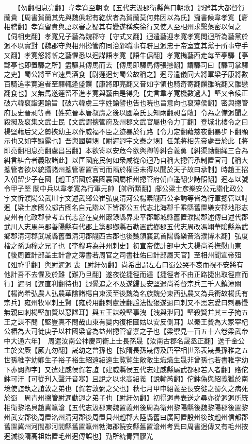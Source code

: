 　　【勿翻相息亮翻】韋孝寛至朝歌【五代志汲郡衛縣舊曰朝歌】迥遣其大都督賀蘭貴【周書賀蘭其先與魏俱起有紇伏者為賀蘭莫何弗因以為氏】齎書候韋孝寛【齎相稽翻】孝寛留貴與語以審之疑其有變遂稱疾徐行又使人至相州求醫藥密以伺之【伺相吏翻】孝寛兄子藝為魏郡守【守式又翻】迥遣藝迎孝寛孝寛問迥所為藝黨於迥不以實對【魏郡守與相州搃管府同治鄴職事有聨且迥忠于帝室宜其黨于所事守手又翻】孝寛怒將斬之藝懼悉以迥謀語孝寛【語牛倨翻】孝寛擕藝西走每至亭驛【亭郵亭也即置驛之所】盡驅其傳馬而去【傳馬即驛馬傳張戀翻】謂驛司曰【驛司掌驛之吏】蜀公將至宜速具酒食【尉遲迥封蜀公故稱之】迥尋遣儀同大將軍梁子康將數百騎追孝寛追者至驛輒逢盛饌【康將即亮翻又音如字領也騎奇寄翻饌雛皖翻又雛戀翻食也】又無馬遂遲留不進孝寛與藝由是得免【史言韋孝寛機數過人】堅又令候正破六韓裒詣迥諭旨【破六韓虜三字姓諭譬也告也暁也旨意向也裒薄侯翻】密與摠管府長史晉昶等書【姓苑晉本唐叔虞之後以國為氏長知兩翻昶音敞】令為之備迥聞之殺昶及裒集文武士民【文武謂摠管府及州郡文武官屬也令力丁翻】登城北樓令之曰楊堅藉后父之勢挾幼主以作威福不臣之迹暴於行路【令力定翻藉慈夜翻暴步卜翻顯示也又如字顯露也】吾與國舅甥【尉遲迥宇文泰之甥】任兼將相先帝處吾於此【將即亮翻相息亮翻處昌呂翻】本欲寄以安危今欲與卿等糾合義勇【糾渠黝翻䋲三合為糾言糾合者義取諸此】以匡國庇民何如衆咸從命迥乃自稱大摠管承制置官司【稱大摠管者欲以統攝諸州摠管署置官司而隔於權臣未得以聞於天子故曰承制】時趙王招入朝留少子在國【趙王招國於襄國襄國屬相州摠管府朝直遥翻少詩照翻】迥奉以號令甲子堅關中兵以韋孝寛為行軍元帥【帥所類翻】郕公梁士彦樂安公元諧化政公宇文忻濮陽公武川宇文述武鄉公崔弘度清河公楊素隴西公李詢等皆為行軍摠管以討迥【梁士彦國公郕古國名自元諧以下皆郡公五代志北海郡千乘縣舊置樂安郡地形志夏州有化政郡參考五代志當在夏州巖録縣界東平郡郵城縣舊置濮陽郡述傳曰述代郡武川人志馬邑郡善陽縣有代郡上黨郡鄉縣石勒置武鄉郡五代志周改馮翊華隂縣為武鄉郡清河郡武城縣舊置清河郡隴西古郡也後魏領襄武首陽縣樂音洛濮博木翻】弘度楷之孫詢穆之兄子也【李穆時為并州刺史】初宣帝使計部中大夫楊尚希撫慰山東【後周置計部盖主計會之簿書若周官之司書杜佑曰計部屬天官】至相州聞宣帝殂【殂祚乎翻】與尉遲迥喪【尉紆勿翻】尚希出謂左右曰蜀公哭不哀而視不安將有他計吾不去懼及於難【難乃旦翻】遂夜從捷徑而遁【捷徑者不由正路捷出取徑直而行】遲明【遲直利翻待也】迥覺追之不及遂歸長安堅遣尚希督宗兵三千人鎮潼關【楊尚希弘農人弘農華隂諸楊自東漢至後魏為名族魏分東西弘農又為兵衝故楊氏有宗兵】雍州牧畢刺王賢【雍於用翻刺盧逹翻諡法愎狠遂過曰刺又不思忘愛曰刺暴慢無親曰刺楊堅加賢以惡諡耳】與五王謀殺堅事洩【洩與泄同】堅殺賢并其三子掩五王之謀不問【堅豈真不問哉山東有變内復相圖姑以安反側耳】以秦王贄為大冢宰杞公椿為大司徒庚子以柱國梁睿為益州摠管睿禦之子也【梁禦見一百五十六卷梁武帝中大通六年】　周遣汝南公神慶司衛上士長孫晟【汝南古郡名晟丞正翻】送千金公主於突厥【厥九勿翻】晟幼之曾孫也【按隋長孫晟傳及唐宰相世系表晟長孫稚之五世孫稚字幼卿生子裕子裕生紹遠紹遠生覧覧生敞敞生熾熾生晟非曾孫也若書稚字幼下亦闕卿字】又遣建威侯賀若誼【建威縣侯五代志建威縣屬武都郡若人者翻】賂佗鉢可汙【可從刋入聲汗音寒】且說之以求高紹義【說輸芮翻】佗鉢偽與紹義獵於南境使誼執之誼敦之弟也【賀若敦弼之父也】秋七月甲申紹義至長安徙之蜀久之病死於蜀　周青州摠管尉遲勤迥之弟子也【尉紆勿翻】初得迥書表送之尋亦從迥迥所統相衛黎洺貝趙冀瀛滄【五代志汲郡東魏置義州後周為衛州黎陽縣後魏黎陽郡後置黎州武安郡後周置洺州清河郡後周置貝州趙郡大陸縣舊曰廣阿置殷州後改趙州信都郡舊置冀州河間郡河間縣舊置瀛州勃海郡饒安縣舊置滄州考異曰周書迥傳又有毛州按迥滅後隋高祖始置毛州迥傳誤也】勤所統青齊膠光

